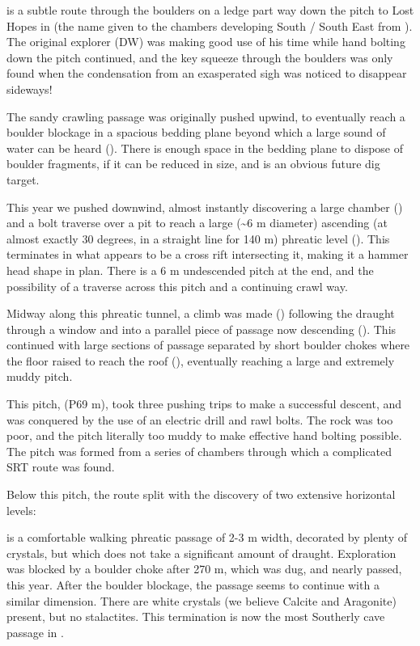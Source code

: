  is a subtle route through the boulders on a ledge part
way down the pitch to Lost Hopes in  (the name given to
the chambers developing South / South East from ). The
original explorer (DW) was making good use of his time while hand
bolting down the pitch continued, and the key squeeze through the
boulders was only found when the condensation from an exasperated sigh
was noticed to disappear sideways!

The sandy crawling passage was originally pushed upwind, to eventually
reach a boulder blockage in a spacious bedding plane beyond which a
large sound of water can be heard (). There is enough
space in the bedding plane to dispose of boulder fragments, if it can be
reduced in size, and is an obvious future dig target.

This year we pushed downwind, almost instantly discovering a large
chamber () and a bolt traverse over a pit to reach a
large (\textasciitilde 6 m diameter) ascending (at almost exactly 30
degrees, in a straight line for 140 m) phreatic level (). This terminates in what appears to be a cross rift intersecting
it, making it a hammer head shape in plan. There is a 6 m undescended
pitch at the end, and the possibility of a traverse across this pitch
and a continuing crawl way.

Midway along this phreatic tunnel, a climb was made ()
following the draught through a window and into a parallel piece of
passage now descending (). This continued with large
sections of passage separated by short boulder chokes where the floor
raised to reach the roof (), eventually reaching a
large and extremely muddy pitch.

This pitch,  (P69 m), took three pushing trips
to make a successful descent, and was conquered by the use of an
electric drill and rawl bolts. The rock was too poor, and the pitch
literally too muddy to make effective hand bolting possible. The pitch
was formed from a series of chambers through which a complicated SRT
route was found.

Below this pitch, the route split with the discovery of two extensive
horizontal levels:

  is a comfortable
walking phreatic passage of 2-3 m width, decorated by plenty of
crystals, but which does not take a significant amount of draught.
Exploration was blocked by a boulder choke after 270 m, which was dug,
and nearly passed, this year. After the boulder blockage, the passage
seems to continue with a similar dimension. There are white crystals (we
believe Calcite and Aragonite) present, but no stalactites. This
termination is now the most Southerly cave passage in .

